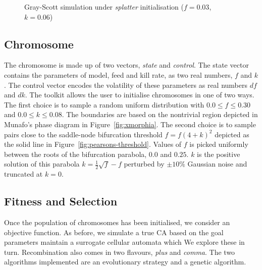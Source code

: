 \begin{figure}[!h]
            \hfill
            \caption{Gray-Scott simulation under \textit{splatter} initialisation ($f = 0.03$, $k = 0.06$)}
\label{fig:splatter}
\end{figure}

\subsection{Chromosome}
The chromosome is made up of two vectors, \textit{state} and \textit{control}. The state vector contains the parameters of model, feed and kill rate, as two real numbers, $f$ and $k$. The control vector encodes the volatility of these parameters as real numbers $df$ and $dk$. The toolkit allows the user to initialise chromosomes in one of two ways. The first choice is to sample a random uniform distribution with $0.0 \leq f \leq 0.30$ and $0.0 \leq k \leq 0.08$. The boundaries are based on the nontrivial region depicted in Munafo's phase diagram in Figure~\ref{fig:xmorphia}. The second choice is to sample pairs close to the saddle-node bifurcation threshold $f = f(4+k)^2$ depicted as the solid line in Figure~\ref{fig:pearsons-threshold}. Values of $f$ is picked uniformly between the roots of the bifurcation parabola, $0.0$ and $0.25$. $k$ is the positive solution of this parabola $k = \frac{1}{2}\sqrt{f} - f$ perturbed by $\pm 10\%$ Gaussian noise and truncated at $k = 0$.\\

\subsection{Fitness and Selection}
Once the population of chromosomes has been initialised, we consider an objective function. As before, we simulate a true CA based on the goal parameters maintain a surrogate cellular automata which  We explore these in turn.
Recombination also comes in two flavours, \textit{plus} and \textit{comma}. The two algorithms implemented are an evolutionary strategy and a genetic algorithm.

